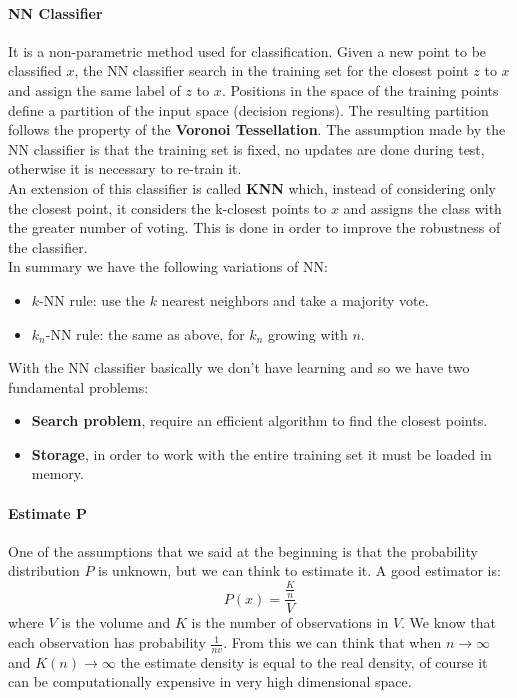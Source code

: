 \paragraph{NN Classifier} It is a non-parametric method used for classification. Given a new point to be classified $x$, the NN classifier search in the training set for the closest point $z$ to $x$ and assign the same label of $z$ to $x$. Positions in the space of the training points define a partition of the input space (decision regions). The resulting partition follows the property of the \textbf{Voronoi Tessellation}. The assumption made by the NN classifier is that the training set is fixed, no updates are done during test, otherwise it is necessary to re-train it. \\
An extension of this classifier is called \textbf{KNN} which, instead  of considering only the closest point, it considers the k-closest points to $x$ and assigns the class with the greater number of voting. This is done in order to improve the robustness of the classifier.\\
In summary we have the following variations of NN:
\begin{itemize}
	\item $k$-NN rule: use the $k$ nearest neighbors and take a majority vote.
	\item $k_n$-NN rule: the same as above, for $k_n$ growing with $n$.
\end{itemize}
With the NN classifier basically we don't have learning and so we have two fundamental problems:
\begin{itemize}
	\item \textbf{Search problem}, require an efficient algorithm to find the closest points.
	\item \textbf{Storage}, in order to work with the entire training set it must be loaded in memory.
\end{itemize}

\paragraph{Estimate P}
One of the assumptions that we said at the beginning is that the probability distribution $P$ is unknown, but we can think to estimate it. A good estimator is:
$$P(x) = \frac{\frac{K}{n}}{V}$$
where $V$ is the volume and $K$  is the number of observations in $V$. We know that each observation has probability $\frac{1}{nv}$. From this we can think that when $n \rightarrow \infty$ and $K(n) \rightarrow \infty$ the estimate density is equal to the real density, of course it can be computationally expensive in very high dimensional space.

